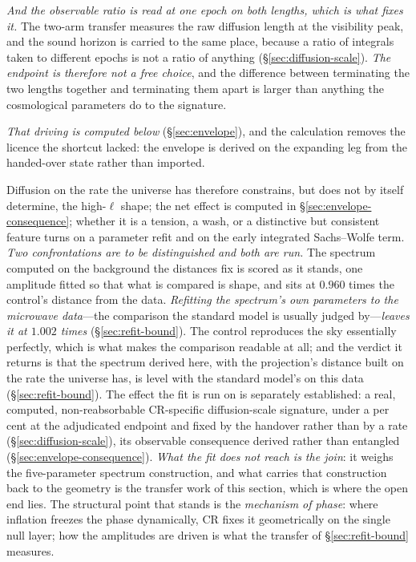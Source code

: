 \documentclass[11pt,a4paper]{article}
\theoremstyle{plain}
\theoremstyle{definition}
\theoremstyle{remark}
\begin{document}
\emph{And the observable ratio is read at one epoch on both lengths, which is what fixes it.} The two-arm transfer measures the raw diffusion length at the visibility peak, and the sound horizon is carried to the same place, because a ratio of integrals taken to different epochs is not a ratio of anything (\S\ref{sec:diffusion-scale}). \emph{The endpoint is therefore not a free choice}, and the difference between terminating the two lengths together and terminating them apart is larger than anything the cosmological parameters do to the signature.

\emph{That driving is computed below} (\S\ref{sec:envelope}), and the calculation removes the licence the shortcut lacked: the envelope is derived on the expanding leg from the handed-over state rather than imported. 

Diffusion on the rate the universe has therefore constrains, but does not by itself determine, the high-$\ell$ shape; the net effect is computed in \S\ref{sec:envelope-consequence}; whether it is a tension, a wash, or a distinctive but consistent feature turns on a parameter refit and on the early integrated Sachs--Wolfe term. \emph{Two confrontations are to be distinguished and both are run.} The spectrum computed on the background the distances fix is scored as it stands, one amplitude fitted so that what is compared is shape, and sits at $0.960$ times the control's distance from the data. \emph{Refitting the spectrum's own parameters to the microwave data}---the comparison the standard model is usually judged by---\emph{leaves it at $1.002$ times} (\S\ref{sec:refit-bound}). The control reproduces the sky essentially perfectly, which is what makes the comparison readable at all; and the verdict it returns is that the spectrum derived here, with the projection's distance built on the rate the universe has, is level with the standard model's on this data (\S\ref{sec:refit-bound}). The effect the fit is run on is separately established: a real, computed, non-reabsorbable
CR-specific diffusion-scale signature, under a per cent at the adjudicated endpoint and fixed by the
handover rather than by a rate (\S\ref{sec:diffusion-scale}), its observable consequence derived rather than entangled
(\S\ref{sec:envelope-consequence}). \emph{What the fit does not reach is the join}: it weighs the
five-parameter spectrum construction, and what carries that construction back to the geometry is the transfer
work of this section, which is where the open end lies. The structural point that stands is the \emph{mechanism of phase}: where inflation freezes the phase dynamically, CR fixes it geometrically on the single null layer; how the amplitudes are driven is what the transfer of \S\ref{sec:refit-bound} measures.
\end{document}
